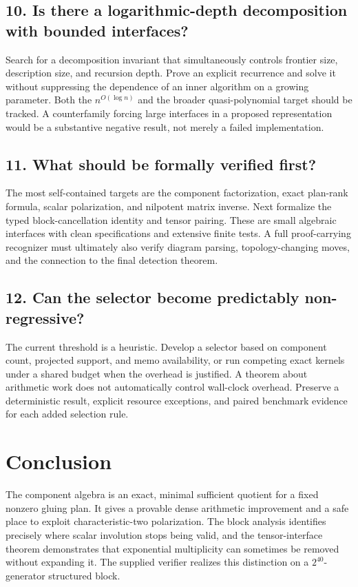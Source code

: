 \documentclass[11pt]{article}
\theoremstyle{definition}\newtheorem{definition}[theorem]{Definition}
\theoremstyle{remark}\newtheorem{remark}[theorem]{Remark}
\begin{document}
\subsection{10. Is there a logarithmic-depth decomposition with bounded interfaces?}
Search for a decomposition invariant that simultaneously controls frontier size, description size, and recursion depth. Prove an explicit recurrence and solve it without suppressing the dependence of an inner algorithm on a growing parameter. Both the $n^{O(\log n)}$ and the broader quasi-polynomial target should be tracked. A counterfamily forcing large interfaces in a proposed representation would be a substantive negative result, not merely a failed implementation.

\subsection{11. What should be formally verified first?}
The most self-contained targets are the component factorization, exact plan-rank formula, scalar polarization, and nilpotent matrix inverse. Next formalize the typed block-cancellation identity and tensor pairing. These are small algebraic interfaces with clean specifications and extensive finite tests. A full proof-carrying recognizer must ultimately also verify diagram parsing, topology-changing moves, and the connection to the final detection theorem.

\subsection{12. Can the selector become predictably non-regressive?}
The current threshold is a heuristic. Develop a selector based on component count, projected support, and memo availability, or run competing exact kernels under a shared budget when the overhead is justified. A theorem about arithmetic work does not automatically control wall-clock overhead. Preserve a deterministic result, explicit resource exceptions, and paired benchmark evidence for each added selection rule.

\section{Conclusion}
The component algebra is an exact, minimal sufficient quotient for a fixed nonzero gluing plan. It gives a provable dense arithmetic improvement and a safe place to exploit characteristic-two polarization. The block analysis identifies precisely where scalar involution stops being valid, and the tensor-interface theorem demonstrates that exponential multiplicity can sometimes be removed without expanding it. The supplied verifier realizes this distinction on a $2^{40}$-generator structured block.
\end{document}
